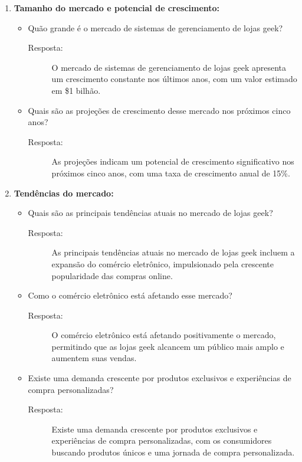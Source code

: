 \documentclass[
	12pt,				%
	openright,			%
	twoside,			%
	a4paper,			%
	english,			%
	brazil				%
	]{abntex2}
\begin{document}
\begin{enumerate}
    \item \textbf{Tamanho do mercado e potencial de crescimento:}
    \begin{itemize}[label=\textbullet]
        \item Quão grande é o mercado de sistemas de gerenciamento de lojas geek?
        \begin{description}
            \item[Resposta:] O mercado de sistemas de gerenciamento de lojas geek apresenta um crescimento constante nos últimos anos, com um valor estimado em \$1 bilhão.
        \end{description}
        \item Quais são as projeções de crescimento desse mercado nos próximos cinco anos?
        \begin{description}
            \item[Resposta:] As projeções indicam um potencial de crescimento significativo nos próximos cinco anos, com uma taxa de crescimento anual de 15\%.
        \end{description}
    \end{itemize}

    \item \textbf{Tendências do mercado:}
    \begin{itemize}[label=\textbullet]
        \item Quais são as principais tendências atuais no mercado de lojas geek?
        \begin{description}
            \item[Resposta:] As principais tendências atuais no mercado de lojas geek incluem a expansão do comércio eletrônico, impulsionado pela crescente popularidade das compras online. 
        \end{description}
        \item Como o comércio eletrônico está afetando esse mercado?
        \begin{description}
            \item[Resposta:] O comércio eletrônico está afetando positivamente o mercado, permitindo que as lojas geek alcancem um público mais amplo e aumentem suas vendas. 	
        \end{description}
        \item Existe uma demanda crescente por produtos exclusivos e experiências de compra personalizadas?
        \begin{description}
            \item[Resposta:] Existe uma demanda crescente por produtos exclusivos e experiências de compra personalizadas, com os consumidores buscando produtos únicos e uma jornada de compra personalizada.
        \end{description} 
    \end{itemize}
\end{enumerate}
\end{document}
